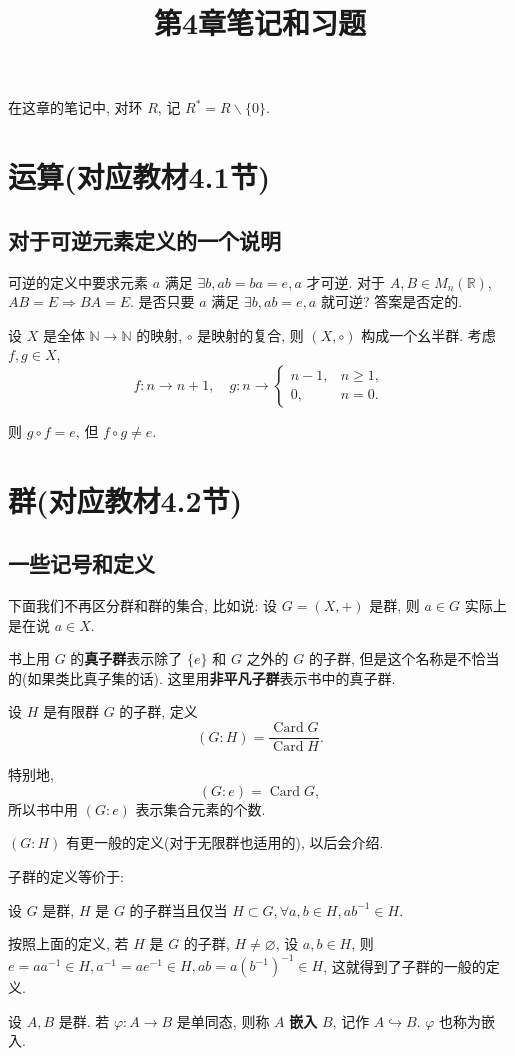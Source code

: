 \documentclass[color=black,device=normal,lang=cn,mode=geye]{elegantnote}
\title{第4章笔记和习题}
\begin{document}
\maketitle
在这章的笔记中, 对环 $R$, 记 $R^*=R\backslash\{0\}$.
\section{运算(对应教材4.1节)}
\subsection{对于可逆元素定义的一个说明}
可逆的定义中要求元素 $a$ 满足 $\exists b,ab=ba=e,a$ 才可逆. 对于 $A,B\in M_n(\mathbb{R})$, $AB=E\Rightarrow BA=E$. 是否只要 $a$ 满足 $\exists b,ab=e,a$ 就可逆? 答案是否定的.

设 $X$ 是全体 $\mathbb{N}\to\mathbb{N}$ 的映射, $\circ$ 是映射的复合, 则 $(X,\circ)$ 构成一个幺半群. 考虑 $f,g\in X$,
\[f:n\to n+1,\quad g:n\to\begin{cases}
    n-1, & n\geq1, \\
    0, & n=0.
\end{cases}\]

则 $g\circ f=e$, 但 $f\circ g\neq e$.
\section{群(对应教材4.2节)}
\subsection{一些记号和定义}
下面我们不再区分群和群的集合, 比如说: 设 $G=(X,+)$ 是群, 则 $a\in G$ 实际上是在说 $a\in X$.

书上用 $G$ 的\textbf{真子群}表示除了 $\{e\}$ 和 $G$ 之外的 $G$ 的子群, 但是这个名称是不恰当的(如果类比真子集的话). 这里用\textbf{非平凡子群}表示书中的真子群.

设 $H$ 是有限群 $G$ 的子群, 定义
\[(G:H)=\dfrac{\operatorname{Card}G}{\operatorname{Card}H}.\]

特别地,
\[(G:e)=\operatorname{Card}G,\]
所以书中用 $(G:e)$ 表示集合元素的个数.

$(G:H)$ 有更一般的定义(对于无限群也适用的), 以后会介绍.

子群的定义等价于:
\begin{definition}\label{d2.1}
    设 $G$ 是群, $H$ 是 $G$ 的子群当且仅当 $H\subset G,\forall a,b\in H,ab^{-1}\in H$.
\end{definition}

按照上面的定义, 若 $H$ 是 $G$ 的子群, $H\neq\varnothing$, 设 $a,b\in H$, 则 $e=aa^{-1}\in H,a^{-1}=ae^{-1}\in H,ab=a(b^{-1})^{-1}\in H$, 这就得到了子群的一般的定义.
\begin{definition}
    设 $A,B$ 是群. 若 $\varphi:A\to B$ 是单同态, 则称 $A$ \textbf{嵌入} $B$, 记作 $A\hookrightarrow B$. $\varphi$ 也称为嵌入.
\end{definition}
\end{document}
